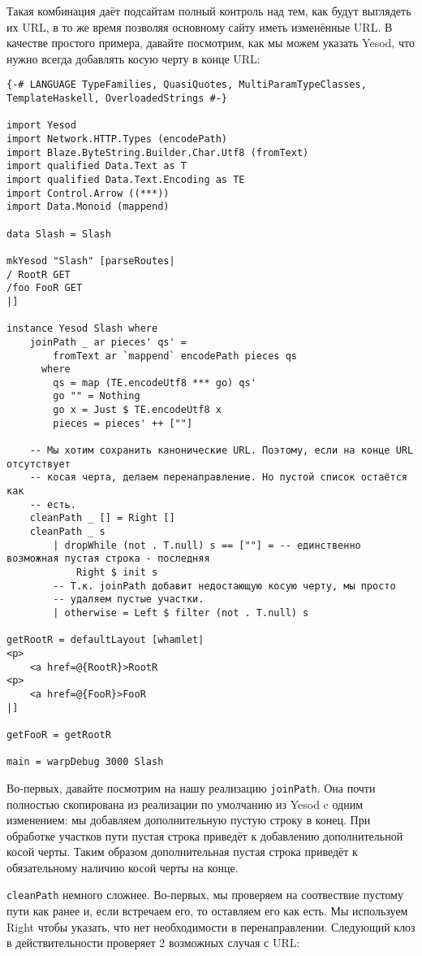 Такая комбинация даёт подсайтам полный контроль над тем, как будут выглядеть их URL, в то же время позволяя основному сайту иметь изменённые URL. В качестве простого примера, давайте посмотрим, как мы можем указать Yesod, что нужно всегда добавлять косую черту в конце URL:

\begin{lstlisting}
{-# LANGUAGE TypeFamilies, QuasiQuotes, MultiParamTypeClasses, TemplateHaskell, OverloadedStrings #-}

import Yesod
import Network.HTTP.Types (encodePath)
import Blaze.ByteString.Builder.Char.Utf8 (fromText)
import qualified Data.Text as T
import qualified Data.Text.Encoding as TE
import Control.Arrow ((***))
import Data.Monoid (mappend)

data Slash = Slash

mkYesod "Slash" [parseRoutes|
/ RootR GET
/foo FooR GET
|]

instance Yesod Slash where
    joinPath _ ar pieces' qs' =
        fromText ar `mappend` encodePath pieces qs
      where
        qs = map (TE.encodeUtf8 *** go) qs'
        go "" = Nothing
        go x = Just $ TE.encodeUtf8 x
        pieces = pieces' ++ [""]

    -- Мы хотим сохранить канонические URL. Поэтому, если на конце URL отсутствует
    -- косая черта, делаем перенаправление. Но пустой список остаётся как
    -- есть.
    cleanPath _ [] = Right []
    cleanPath _ s
        | dropWhile (not . T.null) s == [""] = -- единственно возможная пустая строка - последняя
            Right $ init s
        -- Т.к. joinPath добавит недостающую косую черту, мы просто
        -- удаляем пустые участки.
        | otherwise = Left $ filter (not . T.null) s

getRootR = defaultLayout [whamlet|
<p>
    <a href=@{RootR}>RootR
<p>
    <a href=@{FooR}>FooR
|]

getFooR = getRootR

main = warpDebug 3000 Slash
\end{lstlisting}%

Во-первых, давайте посмотрим на нашу реализацию \lstinline'joinPath'. Она почти полностью скопирована из реализации по умолчанию из Yesod c одним изменением: мы добавляем дополнительную пустую строку в конец. При обработке участков пути пустая строка приведёт к добавлению дополнительной косой черты. Таким образом дополнительная пустая строка приведёт к обязательному наличию косой черты на конце.

\lstinline'cleanPath' немного сложнее. Во-первых, мы проверяем на соотвествие пустому пути как ранее и, если встречаем его, то оставляем его как есть. Мы используем Right чтобы указать, что нет необходимости в перенаправлении. Следующий клоз в действительности проверяет 2 возможных случая с URL:

